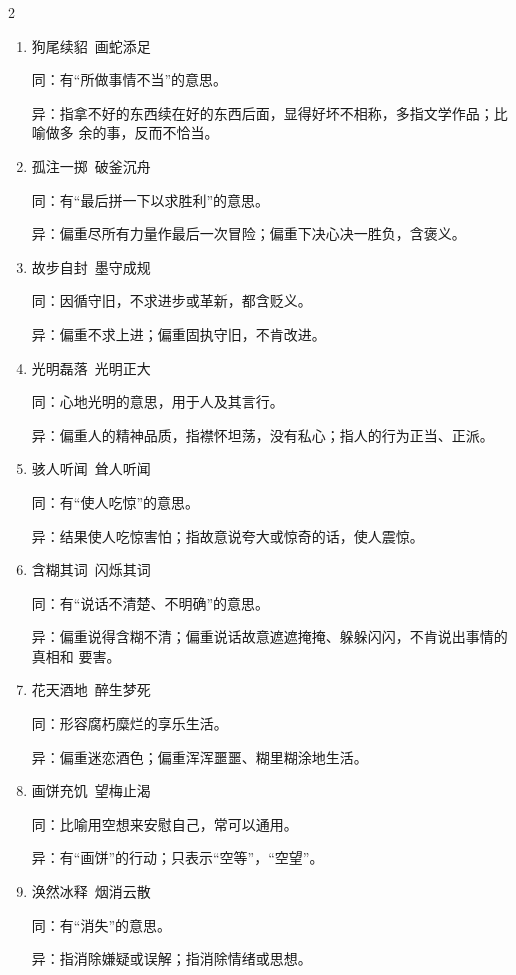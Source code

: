 \documentclass[final,oneside]{ctexbook}
\begin{document}
\begin{multicols}{2}
\begin{enumerate}
    \item 狗尾续貂~画蛇添足

      同：有“所做事情不当”的意思。

      异：指拿不好的东西续在好的东西后面，显得好坏不相称，多指文学作品；比喻做多
      余的事，反而不恰当。

    \item 孤注一掷~破釜沉舟

      同：有“最后拼一下以求胜利”的意思。

      异：偏重尽所有力量作最后一次冒险；偏重下决心决一胜负，含褒义。

    \item 故步自封~墨守成规

      同：因循守旧，不求进步或革新，都含贬义。

      异：偏重不求上进；偏重固执守旧，不肯改进。

    \item 光明磊落~光明正大

      同：心地光明的意思，用于人及其言行。

      异：偏重人的精神品质，指襟怀坦荡，没有私心；指人的行为正当、正派。

    \item 骇人听闻~耸人听闻

      同：有“使人吃惊”的意思。

      异：结果使人吃惊害怕；指故意说夸大或惊奇的话，使人震惊。

    \item 含糊其词~闪烁其词

      同：有“说话不清楚、不明确”的意思。

      异：偏重说得含糊不清；偏重说话故意遮遮掩掩、躲躲闪闪，不肯说出事情的真相和
      要害。

    \item 花天酒地~醉生梦死

      同：形容腐朽糜烂的享乐生活。

      异：偏重迷恋酒色；偏重浑浑噩噩、糊里糊涂地生活。

    \item 画饼充饥~望梅止渴

      同：比喻用空想来安慰自己，常可以通用。

      异：有“画饼”的行动；只表示“空等”，“空望”。

    \item 涣然冰释~烟消云散

      同：有“消失”的意思。

      异：指消除嫌疑或误解；指消除情绪或思想。


\end{enumerate}
\end{multicols}
\end{document}
